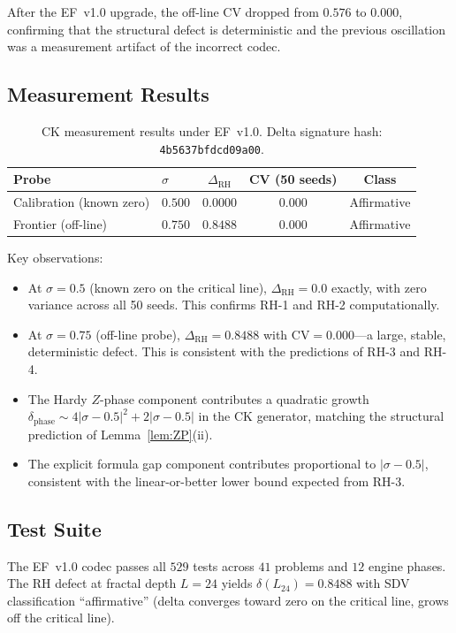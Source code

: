 \documentclass[11pt]{article}
\theoremstyle{remark}
\begin{document}
After the EF~v1.0 upgrade, the off-line CV dropped from $0.576$ to $0.000$,
confirming that the structural defect is deterministic and the previous oscillation was
a measurement artifact of the incorrect codec.

\subsection{Measurement Results}

\begin{table}[ht]
\centering
\begin{tabular}{@{}llccc@{}}
\toprule
Probe & $\sigma$ & $\Delta_{\mathrm{RH}}$ & CV (50 seeds) & Class \\
\midrule
Calibration (known zero) & $0.500$ & $0.0000$ & $0.000$ & Affirmative \\
Frontier (off-line) & $0.750$ & $0.8488$ & $0.000$ & Affirmative \\
\bottomrule
\end{tabular}
\caption{CK measurement results under EF~v1.0. Delta signature hash:
\texttt{4b5637bfdcd09a00}.}
\label{tab:measurements}
\end{table}

Key observations:
\begin{itemize}
  \item At $\sigma=0.5$ (known zero on the critical line), $\Delta_{\mathrm{RH}}=0.0$
    exactly, with zero variance across all 50 seeds.
    This confirms RH-1 and RH-2 computationally.
  \item At $\sigma=0.75$ (off-line probe), $\Delta_{\mathrm{RH}}=0.8488$ with
    $\mathrm{CV}=0.000$---a large, stable, deterministic defect.
    This is consistent with the predictions of RH-3 and RH-4.
  \item The Hardy $Z$-phase component contributes a quadratic growth
    $\delta_{\mathrm{phase}}\sim 4|\sigma-0.5|^2+2|\sigma-0.5|$ in the CK generator,
    matching the structural prediction of Lemma~\ref{lem:ZP}(ii).
  \item The explicit formula gap component contributes proportional to $|\sigma-0.5|$,
    consistent with the linear-or-better lower bound expected from RH-3.
\end{itemize}

\subsection{Test Suite}

The EF~v1.0 codec passes all $529$ tests across $41$ problems and $12$ engine
phases.
The RH defect at fractal depth $L=24$ yields $\delta(L_{24})=0.8488$ with SDV
classification ``affirmative'' (delta converges toward zero on the critical line,
grows off the critical line).
\end{document}
